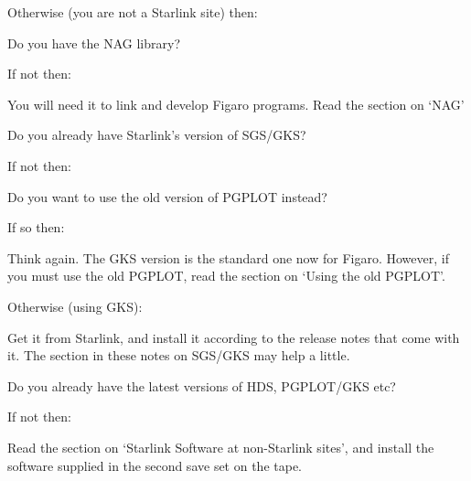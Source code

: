 Otherwise (you are not a Starlink site) then:
\begin{description}
	\item Do you have the NAG library?
	\begin{description}
		\item If not then:
		\begin{description}
			\item You will need it to link and develop Figaro 
programs. Read the section on `NAG'
		\end{description}
	\end{description}
	\item Do you already have Starlink's version of SGS/GKS?
	\begin{description}
		\item If not then:
		\begin{description}
			\item Do you want to use the old version of PGPLOT 
instead?
			\begin{description}
				\item If so then:
				\begin{description}
					\item Think again. The GKS version is 
the standard one now for Figaro. However, if you must use the old PGPLOT, read 
the section on `Using the old PGPLOT'.
				\end{description}
				\item Otherwise (using GKS):
                         	\begin{description}
					\item Get it from Starlink, and 
install it according to the release notes that come with it. The section in 
these notes on SGS/GKS may help a little.
				\end{description}
			\end{description}
		\end{description}
	\end{description}
	\item Do you already have the latest versions of HDS, PGPLOT/GKS etc?
	\begin{description}
		\item If not then:
		\begin{description}
			\item Read the section on `Starlink Software at 
non-Starlink sites', and install the software supplied in the second save set 
on the tape.
		\end{description}
	\end{description}
\end{description}

